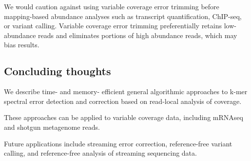 \documentclass{article}
\begin{document}
We would caution against using variable coverage error trimming before
mapping-based abundance analyses such as transcript quantification,
ChIP-seq, or variant calling.  Variable coverage error trimming
preferentially retains low-abundance reads and eliminates portions of
high abundance reads, which may bias results.

\subsection{Concluding thoughts}

We describe time- and memory- efficient general algorithmic approaches
to k-mer spectral error detection and correction based on read-local
analysis of coverage.

These approaches can be applied to variable coverage data, including
mRNAseq and shotgun metagenome reads.

Future applications include streaming error correction, reference-free
variant calling, and reference-free analysis of streaming sequencing
data.


\end{document}
